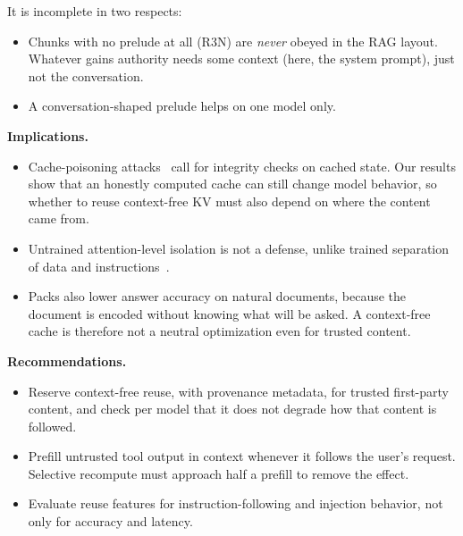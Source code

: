 \documentclass[10pt]{article}
\newcommand{\cond}[1]{\textsf{#1}}
\begin{document}
It is incomplete in two respects:
\begin{itemize}
\item Chunks with no prelude at all (\cond{R3N}) are \emph{never} obeyed in the RAG layout. Whatever gains authority needs some
  context (here, the system prompt), just not the conversation.
\item A conversation-shaped prelude helps on one model only.
\end{itemize}

\textbf{Implications.}
\begin{itemize}
\item Cache-poisoning attacks~\citep{zhang2026hijackkv,zhu2026r2ecap} call for integrity checks on cached state. Our results show
  that an honestly computed cache can still change model behavior, so whether to reuse context-free KV must also depend on where the
  content came from.
\item Untrained attention-level isolation is not a defense, unlike trained separation of data and
  instructions~\citep{chen2025struq,chen2025secalign}.
\item Packs also lower answer accuracy on natural documents, because the document is encoded without knowing what will be asked. A
  context-free cache is therefore not a neutral optimization even for trusted content.
\end{itemize}

\textbf{Recommendations.}
\begin{itemize}
\item Reserve context-free reuse, with provenance metadata, for trusted first-party content, and check per model that it does not
  degrade how that content is followed.
\item Prefill untrusted tool output in context whenever it follows the user's request. Selective recompute must approach half a
  prefill to remove the effect.
\item Evaluate reuse features for instruction-following and injection behavior, not only for accuracy and latency.
\end{itemize}
\end{document}
